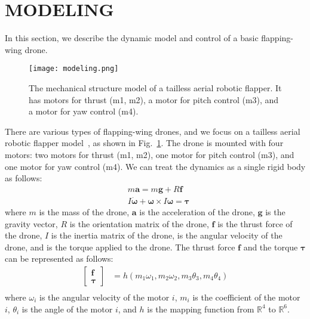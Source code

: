 \section{MODELING}
\label{sec:modeling}
In this section, we describe the dynamic model and control of a basic flapping-wing drone.
\begin{figure}[b]
    \centering
    \texttt{[image: modeling.png]}
    \caption{The mechanical structure model of a tailless aerial robotic flapper. It has motors for thrust (m1, m2), a motor for pitch control (m3), and a motor for yaw control (m4).}
    \label{figure:modeling}
  \end{figure}
There are various types of flapping-wing drones, and we focus on a tailless aerial robotic flapper model~\cite{karasek2018tailless}, as shown in Fig.~\ref{figure:modeling}.
The drone is mounted with four motors: two motors for thrust (m1, m2), one motor for pitch control (m3), and one motor for yaw control (m4).
We can treat the dynamics as a single rigid body as follows:
\begin{equation}
    \begin{aligned}
      &m\bm{a} = m\bm{g} + \mathit{R}\bm{f} \\
      &\mathit{I}\dot{\bm{\omega}} + \bm{\omega} \times \mathit{I}\bm{\omega} = \bm{\tau}
    \end{aligned}
\end{equation}
where $m$ is the mass of the drone, 
$\bm{a}$ is the acceleration of the drone,
$\bm{g}$ is the gravity vector,
$\mathit{R}$ is the orientation matrix of the drone,
$\bm{f}$ is the thrust force of the drone,
$\mathit{I}$ is the inertia matrix of the drone, 
\bm{$\omega$} is the angular velocity of the drone, 
and \bm{$\tau$} is the torque applied to the drone.
The thrust force $\bm{f}$ and the torque $\bm{\tau}$ can be represented as follows:
\begin{equation}
  \label{eq:control}
  \begin{aligned}
    \begin{bmatrix}
      \bm{f}\\
      \bm{\tau}
    \end{bmatrix}
    &=
    h(m_1\omega_1, m_2\omega_2, m_3\theta_3, m_4\theta_4)\\
  \end{aligned}
\end{equation}
where $\omega_i$ is the angular velocity of the motor $i$, $m_i$ is the coefficient of the motor $i$, $\theta_i$ is the angle of the motor $i$, and $h$ is the mapping function from $\mathbb{R}^4$ to $\mathbb{R}^6$.
